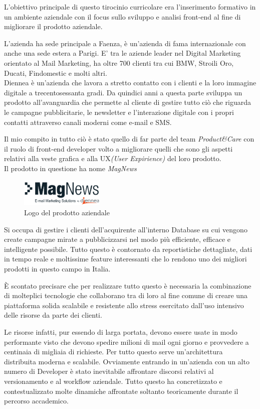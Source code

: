 \documentclass[a4paper]{article}
\begin{document}
\par L'obiettivo principale di questo tirocinio curricolare era l'inserimento formativo
in un ambiente aziendale con il focus sullo sviluppo e analisi front-end al fine di
migliorare il prodotto aziendale.\\
\par L'azienda ha sede principale a Faenza, è un'azienda di fama internazionale con 
anche una sede estera a Parigi. E' tra le aziende leader nel Digital \mbox{Marketing} 
orientato al Mail Marketing, ha oltre 700 clienti tra cui BMW, Stroili Oro, Ducati,
 Findomestic e molti altri.\\
Diennea è un'azienda che lavora a stretto contatto con i clienti e la loro immagine digitale a 
trecentosessanta gradi. Da quindici anni a questa parte sviluppa un prodotto all'avanguardia
che permette al cliente di gestire tutto ciò che riguarda le campagne pubblicitarie, le newsletter e 
l'interazione digitale con i propri contatti attraverso canali moderni come e-mail e SMS.\\
\par Il mio compito in tutto ciò è stato quello di far parte del team \emph{Product\&Care} con il ruolo di 
front-end developer volto a migliorare quelli che sono gli aspetti relativi alla 
veste grafica e alla UX\emph{(User Expirience)} del loro prodotto.\\
Il prodotto in questione ha nome \emph{MagNews}
\begin{figure}[H]
	\includegraphics[width=4cm]{magnews-diennea.png}
	\centering
	\caption{Logo del prodotto aziendale}
\end{figure}
\par Si occupa di gestire i clienti dell'acquirente all'interno Database su cui vengono
create campagne mirate a pubblicizzarsi nel modo più efficiente, efficace e intelligente 
possibile. Tutto questo è contornato da reportistiche dettagliate, dati in tempo reale 
e moltissime feature interessanti che lo rendono uno dei migliori prodotti in questo
campo in Italia.
\par È scontato precisare che per realizzare tutto questo è necessaria la combinazione
di molteplici tecnologie che collaborano tra di loro al fine comune di creare una piattaforma solida
scalabile e resistente allo stress esercitato dall'uso intensivo delle risorse da parte dei clienti.
\par Le risorse infatti, pur essendo di larga portata, devono essere usate in modo
performante visto che devono spedire milioni di mail ogni giorno e provvedere a centinaia
di migliaia di richieste. Per tutto questo serve un'architettura distribuita moderna 
e scalabile. Ovviamente entrando in un'azienda con un alto numero di Developer è 
stato inevitabile affrontare discorsi relativi al versionamento e al workflow aziendale. 
Tutto questo ha concretizzato e contestualizzato molte dinamiche affrontate soltanto teoricamente 
durante il percorso accademico. 
\end{document}
